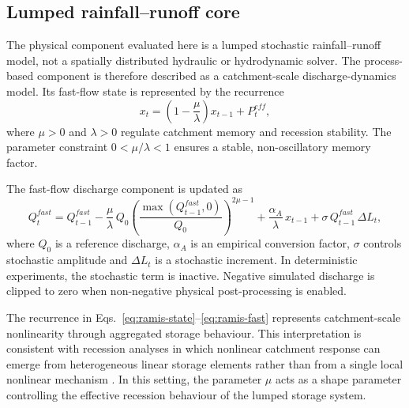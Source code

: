 \subsection{Lumped rainfall--runoff core}\label{subsec:physical-core}

The physical component evaluated here is a lumped stochastic
rainfall--runoff model, not a spatially distributed hydraulic or
hydrodynamic solver. The process-based component is therefore described
as a catchment-scale discharge-dynamics model. Its fast-flow state is
represented by the recurrence
\begin{equation}
x_t = \left(1 - \frac{\mu}{\lambda}\right)x_{t-1} + P^{eff}_t,
\label{eq:ramis-state}
\end{equation}
where $\mu>0$ and $\lambda>0$ regulate catchment memory and recession
stability. The parameter constraint $0<\mu/\lambda<1$ ensures a stable,
non-oscillatory memory factor.

The fast-flow discharge component is updated as
\begin{equation}
Q^{fast}_t = Q^{fast}_{t-1}
  - \frac{\mu}{\lambda}\,Q_0
    \left(\frac{\max(Q^{fast}_{t-1},0)}{Q_0}\right)^{2\mu-1}
  + \frac{\alpha_A}{\lambda}\,x_{t-1}
  + \sigma\,Q^{fast}_{t-1}\,\Delta L_t,
\label{eq:ramis-fast}
\end{equation}
where $Q_0$ is a reference discharge, $\alpha_A$ is an empirical
conversion factor, $\sigma$ controls stochastic amplitude and
$\Delta L_t$ is a stochastic increment. In deterministic experiments,
the stochastic term is inactive. Negative simulated discharge is clipped
to zero when non-negative physical post-processing is enabled.

The recurrence in Eqs.~\ref{eq:ramis-state}--\ref{eq:ramis-fast}
represents catchment-scale nonlinearity through aggregated storage
behaviour. This interpretation is consistent with recession analyses in
which nonlinear catchment response can emerge from heterogeneous linear
storage elements rather than from a single local nonlinear mechanism
\citep{harman2009power}. In this setting, the parameter $\mu$ acts as a
shape parameter controlling the effective recession behaviour of the
lumped storage system.

